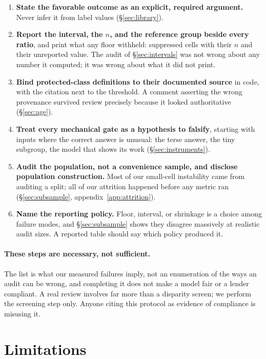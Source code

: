 \documentclass[sigconf,nonacm]{acmart}
\begin{document}
\begin{enumerate}
  \item \textbf{State the favorable outcome as an explicit, required
        argument.} Never infer it from label values (\S\ref{sec:library}).
  \item \textbf{Report the interval, the $n$, and the reference group beside
        every ratio}, and print what any floor withheld: suppressed cells
        with their $n$ and their unreported value. The audit of
        \S\ref{sec:intervals} was not wrong about any number it computed; it
        was wrong about what it did not print.
  \item \textbf{Bind protected-class definitions to their documented source}
        in code, with the citation next to the threshold. A comment asserting
        the wrong provenance survived review precisely because it looked
        authoritative (\S\ref{sec:age}).
  \item \textbf{Treat every mechanical gate as a hypothesis to falsify},
        starting with inputs where the correct answer is unusual: the terse
        answer, the tiny subgroup, the model that shows its work
        (\S\ref{sec:instruments}).
  \item \textbf{Audit the population, not a convenience sample, and disclose
        population construction.} Most of our small-cell instability came from
        auditing a split; all of our attrition happened before any metric ran
        (\S\ref{sec:subsample}, appendix~\ref{app:attrition}).
  \item \textbf{Name the reporting policy.} Floor, interval, or shrinkage is a
        choice among failure modes, and \S\ref{sec:subsample} shows they
        disagree massively at realistic audit sizes. A reported table should
        say which policy produced it.
\end{enumerate}

\paragraph{These steps are necessary, not sufficient.} The list is what our
measured failures imply, not an enumeration of the ways an audit can be wrong,
and completing it does not make a model fair or a lender compliant. A real
review involves far more than a disparity screen; we perform the screening
step only. Anyone citing
this protocol as evidence of compliance is misusing it.

\section{Limitations}
\label{sec:limitations}
\end{document}

